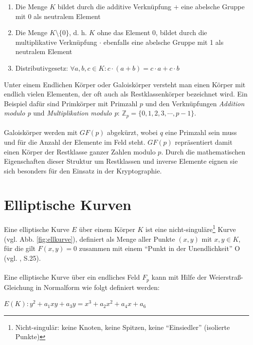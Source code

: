 \begin{enumerate}
  \item Die Menge $K$ bildet durch die additive Verknüpfung $+$ eine abelsche Gruppe
mit 0 als neutralem Element
  \item Die Menge $K\setminus\{0\}$, d. h. $K$ ohne das Element 0, bildet durch die multiplikative Verknüpfung $\cdot$ ebenfalls eine abelsche Gruppe mit 1 als neutralem Element
  \item Distributivgesetz: $ \forall a,b,c \in K: c \cdot (a + b) = c \cdot a + c \cdot b $ \\
\end{enumerate}

Unter einem Endlichen Körper oder Galoiskörper versteht man einen Körper mit endlich vielen Elementen, der oft auch als Restklassenkörper bezeichnet wird. Ein Beispiel dafür sind Primkörper mit Primzahl $p$ und den Verknüpfungen \textit{Addition modulo p} und \textit{Multiplikation modulo p}: $\mathbb{Z}_p = \{0,1,2,3,\cdots,p-1\}$. 
\\ \\
Galoiskörper werden mit $GF(p)$ abgekürzt, wobei $q$ eine Primzahl sein muss und für die Anzahl der Elemente im Feld steht. $GF(p)$ repräsentiert damit einen Körper der Restklasse ganzer Zahlen modulo $p$. Durch die mathematischen Eigenschaften dieser Struktur um Restklassen und inverse Elemente eignen sie sich besonders für den Einsatz in der Kryptographie.

\section{Elliptische Kurven} 
\label{sec:ell}

Eine elliptische Kurve $E$ über einem Körper $K$ ist eine nicht-singuläre\footnote{Nicht-singulär: keine Knoten, keine Spitzen, keine ``Einsiedler'' (isolierte Punkte)} Kurve (vgl. Abb. \ref{fig:ellkurve}), definiert als Menge aller Punkte $(x,y)$ mit $x,y \in K$, für die gilt $F(x,y)=0$ zusammen mit einem ``Punkt in der Unendlichkeit'' O (vgl. \cite{grebe}, S.25).
\\ \\
Eine elliptische Kurve über ein endliches Feld $F_p$ kann mit Hilfe der Weierstraß-Gleichung in Normalform wie folgt definiert werden:

\begin{center}
$E(K): y^2 + a_1 x y + a_3 y = x^3 + a_2 x^2 + a_4 x + a_6 $
\end{center}

